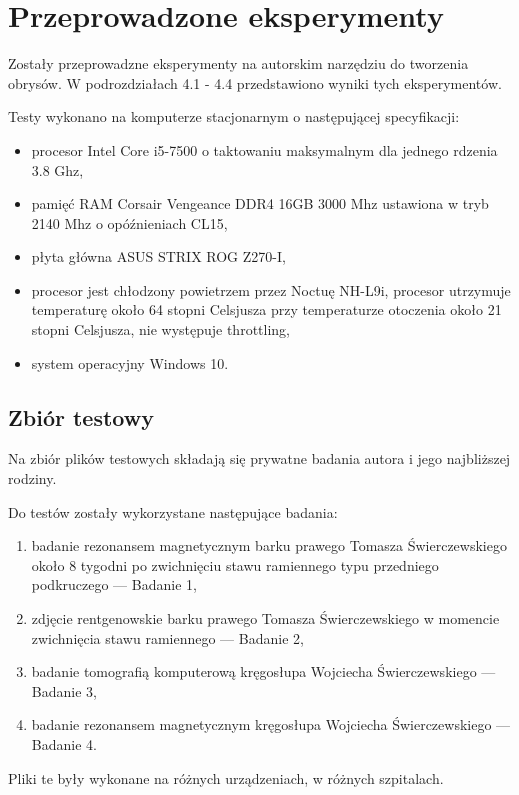 \documentclass[a4paper,11pt,twoside,openright]{report}
\newcommand\blankpage{%
    \null
    \thispagestyle{empty}%
    \newpage}
\theoremstyle{definition}
\begin{document}
\afterpage{\blankpage}

\chapter {Przeprowadzone eksperymenty}

Zostały przeprowadzne eksperymenty na autorskim narzędziu do tworzenia obrysów.
W podrozdziałach 4.1 - 4.4 przedstawiono wyniki tych eksperymentów.

Testy wykonano na komputerze stacjonarnym o następującej specyfikacji:
\begin{itemize}[noitemsep]
\item procesor Intel Core i5-7500 o taktowaniu maksymalnym dla jednego rdzenia 3.8 Ghz,
\item pamięć RAM Corsair Vengeance DDR4 16GB 3000 Mhz ustawiona w tryb 2140 Mhz o opóźnieniach CL15,
\item płyta główna ASUS STRIX ROG Z270-I,
\item procesor jest chłodzony powietrzem przez Noctuę NH-L9i, procesor utrzymuje
temperaturę około 64 stopni Celsjusza przy temperaturze otoczenia około 21 stopni
Celsjusza, nie występuje throttling,
\item system operacyjny Windows 10.
\end{itemize}

\section {Zbiór testowy}

Na zbiór plików testowych składają się prywatne badania autora i jego najbliższej rodziny.

Do testów zostały wykorzystane następujące badania:
\begin{enumerate}[noitemsep]
\item badanie rezonansem magnetycznym barku prawego Tomasza Świerczewskiego około
8 tygodni po zwichnięciu stawu ramiennego typu przedniego podkruczego --- Badanie 1,
\item zdjęcie rentgenowskie barku prawego Tomasza Świerczewskiego w momencie zwichnięcia stawu ramiennego --- Badanie 2,
\item badanie tomografią komputerową kręgosłupa Wojciecha Świerczewskiego --- Badanie 3,
\item badanie rezonansem magnetycznym kręgosłupa Wojciecha Świerczewskiego --- Badanie 4.
\end{enumerate}

Pliki te były wykonane na różnych urządzeniach, w różnych szpitalach.
\end{document}
